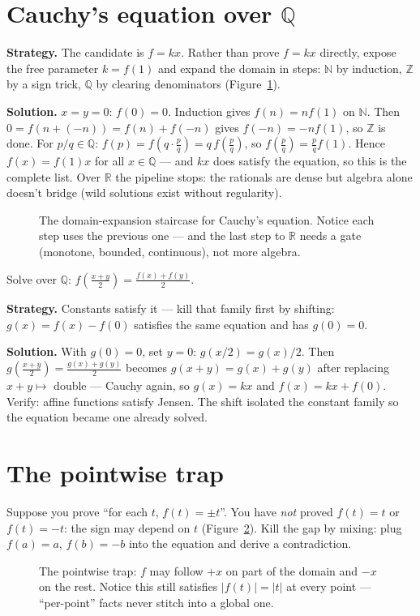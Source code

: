 \section{Cauchy's equation over $\mathbb Q$}
\begin{example}[Solve $f(x+y)=f(x)+f(y)$ over $\mathbb Q$]
\textbf{Strategy.} The candidate is $f=kx$. Rather than prove $f=kx$
directly, expose the free parameter $k=f(1)$ and expand the domain in
steps: $\mathbb N$ by induction, $\mathbb Z$ by a sign trick, $\mathbb Q$ by clearing denominators
(Figure~\ref{fig:stairs}).

\textbf{Solution.} $x=y=0$: $f(0)=0$. Induction gives $f(n)=nf(1)$ on
$\mathbb N$. Then $0=f(n+(-n))=f(n)+f(-n)$ gives $f(-n)=-nf(1)$, so $\mathbb Z$ is done.
For $p/q\in\mathbb Q$: $f(p) = f(q\cdot\tfrac pq) = q\,f(\tfrac pq)$,
so $f(\tfrac pq) = \tfrac pq f(1)$. Hence $f(x)=f(1)x$ for all
$x\in\mathbb Q$ --- and $kx$ does satisfy the equation, so this is the
complete list. Over $\mathbb R$ the pipeline stops: the rationals are
dense but algebra alone doesn't bridge (wild solutions exist without
regularity).
\end{example}
\begin{figure}[ht]\centering

\caption{The domain-expansion staircase for Cauchy's equation. Notice
each step uses the previous one --- and the last step to $\mathbb R$
needs a gate (monotone, bounded, continuous), not more algebra.}
\label{fig:stairs}
\end{figure}

\begin{example}
Solve over $\mathbb Q$: $f(\tfrac{x+y}{2}) = \tfrac{f(x)+f(y)}{2}$.

\textbf{Strategy.} Constants satisfy it --- kill that family first by
shifting: $g(x) = f(x) - f(0)$ satisfies the same equation and has
$g(0)=0$.

\textbf{Solution.} With $g(0)=0$, set $y=0$:
$g(x/2)=g(x)/2$. Then $g(\frac{x+y}{2}) = \frac{g(x)+g(y)}{2}$ becomes
$g(x+y) = g(x)+g(y)$ after replacing $x+y\mapsto$ double --- Cauchy
again, so $g(x)=kx$ and $f(x) = kx + f(0)$. Verify: affine functions
satisfy Jensen. The shift isolated the constant family so the equation
became one already solved.
\end{example}

\section{The pointwise trap}
Suppose you prove ``for each $t$, $f(t)=\pm t$''. You have \emph{not}
proved $f(t)=t$ or $f(t)=-t$: the sign may depend on $t$
(Figure~\ref{fig:trap}). Kill the gap by mixing: plug $f(a)=a$,
$f(b)=-b$ into the equation and derive a contradiction.
\begin{figure}[ht]\centering

\caption{The pointwise trap: $f$ may follow $+x$ on part of the domain
and $-x$ on the rest. Notice this still satisfies $|f(t)|=|t|$ at every
point --- ``per-point'' facts never stitch into a global one.}
\label{fig:trap}
\end{figure}

